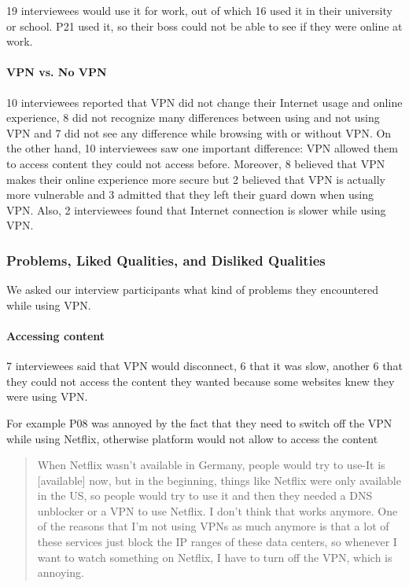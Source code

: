 19 interviewees would use it for work, out of which 16 used it in their
university or school. P21 used it, so their boss could not be able to see if
they were online at work.



\paragraph{VPN vs. No VPN} 10 interviewees reported that VPN did not change their
Internet usage and online experience, 8 did not recognize many differences
between using and not using VPN and 7 did not see any difference while
browsing with or without VPN. On the other hand, 10 interviewees saw one
important difference: VPN allowed them to access content they could not access
before. Moreover, 8 believed that VPN makes their online experience more
secure but 2 believed that VPN is actually more vulnerable and 3 admitted that
they left their guard down when using VPN. Also, 2 interviewees found that
Internet connection is slower while using VPN. 


\subsubsection{Problems, Liked Qualities, and Disliked Qualities}
We asked our
interview participants what kind of problems they encountered while using VPN.
\paragraph{Accessing content} 7 interviewees said that VPN would disconnect, 6
that it was slow, another 6 that they could not access the content they wanted
because some websites knew they were using VPN. 


For example P08 was annoyed by the fact that they need to switch off the VPN
while using Netflix, otherwise platform would not allow to access the content

\begin{quote}When Netflix wasn't available in Germany, people would try to use-It is [available] now, but in the beginning, things like Netflix were
only available in the US, so people would try to use it and then they needed a
DNS unblocker or a VPN to use Netflix. I don't think that works anymore. One
of the reasons that I'm not using VPNs as much anymore is that a lot of these
services just block the IP ranges of these data centers, so whenever I want to
watch something on Netflix, I have to turn off the VPN, which is annoying.
\end{quote}


